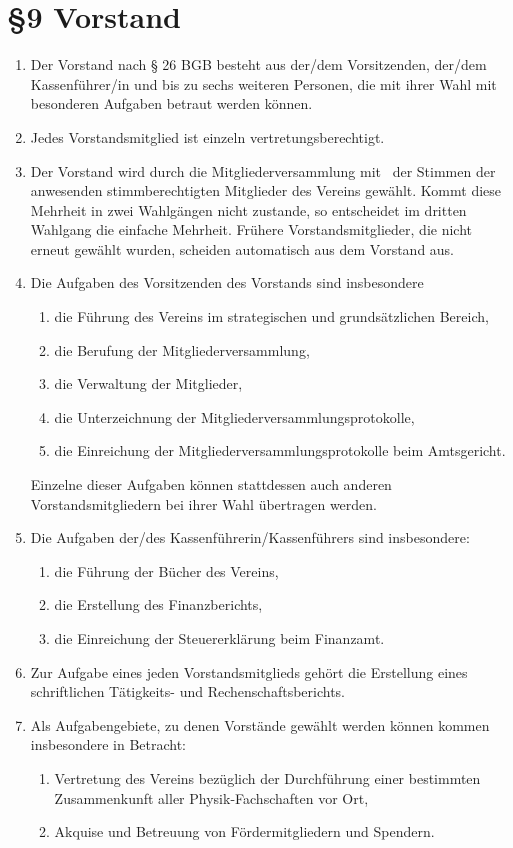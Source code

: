 \documentclass[11pt,ngerman]{article}
\begin{document}
\section*{§9 Vorstand}
\begin{enumerate}
 \item Der Vorstand nach § 26 BGB besteht aus der/dem Vorsitzenden, der/dem Kassenführer/in und bis zu sechs weiteren Personen, die mit ihrer Wahl mit besonderen Aufgaben betraut werden können.
 \item Jedes Vorstandsmitglied ist einzeln vertretungsberechtigt.
 \item Der Vorstand wird durch die Mitgliederversammlung mit \ der Stimmen der anwesenden stimmberechtigten Mitglieder des Vereins gewählt.
       Kommt diese Mehrheit in zwei Wahlgängen nicht zustande, so entscheidet im dritten Wahlgang die einfache Mehrheit.
       Frühere Vorstandsmitglieder, die nicht erneut gewählt wurden, scheiden automatisch aus dem Vorstand aus.
 \item Die Aufgaben des Vorsitzenden des Vorstands sind insbesondere
  \begin{enumerate}
   \item die Führung des Vereins im strategischen und grundsätzlichen Bereich,
   \item die Berufung der Mitgliederversammlung,
   \item die Verwaltung der Mitglieder,
   \item die Unterzeichnung der Mitgliederversammlungsprotokolle,
   \item die Einreichung der Mitgliederversammlungsprotokolle beim Amtsgericht.
  \end{enumerate}
  Einzelne dieser Aufgaben können stattdessen auch anderen Vorstandsmitgliedern bei ihrer Wahl übertragen werden.

 \item Die Aufgaben der/des Kassenführerin/Kassenführers sind insbesondere:
  \begin{enumerate}
   \item die Führung der Bücher des Vereins,
   \item die Erstellung des Finanzberichts,
   \item die Einreichung der Steuererklärung beim Finanzamt.
  \end{enumerate}

 \item Zur Aufgabe eines jeden Vorstandsmitglieds gehört die Erstellung eines schriftlichen Tätigkeits- und Rechenschaftsberichts.

  \item Als Aufgabengebiete, zu denen Vorstände gewählt werden können kommen insbesondere in Betracht:
  \begin{enumerate}
   \item Vertretung des Vereins bezüglich der Durchführung einer bestimmten Zusammenkunft aller Physik-Fachschaften vor Ort,
   \item Akquise und Betreuung von Fördermitgliedern und Spendern.
  \end{enumerate}
\end{enumerate}
\end{document}
